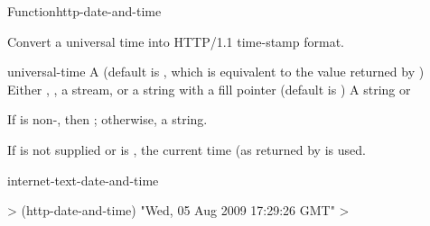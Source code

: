 \documentclass[10pt,twoside,english,pdftex]{article}
\begin{document}
\begin{functiondoc}{Function}{http-date-and-time}{%
    }
% 

\fnsyntax

\fnpurpose Convert a universal time into HTTP/1.1 time-stamp format.

\fnpackage {}

\fnmodule {}

\fnargs
\begin{args}{universal-time}
 A  (default is \nil,
  which is equivalent to the value returned by
  )
\arg[destination] Either \nil, , a stream, or a string with a fill 
pointer (default is \nil)
\arg[result] A string or \nil{}
\end{args}

\fnreturns If  is non-\nil, then \nil; otherwise, a string.

\fndescription
{}%
%
If  is not supplied or is \nil, the current time
(as returned by  is used.

\begin{alsos}{internet-text-date-and-time}
\end{alsos}

\fnexample
%
\W\supp
\begin{example}
  > (http-date-and-time)
  "Wed, 05 Aug 2009 17:29:26 GMT"
  >
\end{example}

\end{functiondoc}

\end{document}
